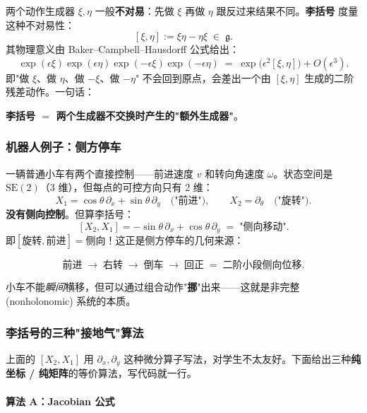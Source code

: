 \documentclass[11pt,a4paper]{article}
\theoremstyle{mythm}
\theoremstyle{mydef}
\begin{document}
两个动作生成器 $\xi, \eta$ 一般\textbf{不对易}：先做 $\xi$ 再做 $\eta$ 跟反过来结果不同。\textbf{李括号} 度量这种不对易性：
$$[\xi, \eta] := \xi\eta - \eta\xi \;\in\; \mathfrak{g}.$$
其物理意义由 Baker--Campbell--Hausdorff 公式给出：
\begin{equation}\label{eq:bch}
\exp(\epsilon\xi)\exp(\epsilon\eta)\exp(-\epsilon\xi)\exp(-\epsilon\eta) \;=\; \exp\!\big(\epsilon^2 [\xi,\eta]\big) + O(\epsilon^3).
\end{equation}
即"做 $\xi$、做 $\eta$、做 $-\xi$、做 $-\eta$" 不会回到原点，会差出一个由 $[\xi,\eta]$ 生成的二阶残差动作。一句话：

\begin{tcolorbox}[colback=yellow!8,colframe=orange!50!black]
\textbf{李括号 $=$ 两个生成器不交换时产生的"额外生成器"}。
\end{tcolorbox}

\subsubsection*{机器人例子：侧方停车}

一辆普通小车有两个直接控制——前进速度 $v$ 和转向角速度 $\omega$。状态空间是 $\mathrm{SE}(2)$（3 维），但每点的可控方向只有 2 维：
$$X_1 = \cos\theta\,\partial_x + \sin\theta\,\partial_y\quad\text{("前进")},\qquad X_2 = \partial_\theta\quad\text{("旋转")}.$$
\textbf{没有侧向控制}。但算李括号：
$$[X_2, X_1] = -\sin\theta\,\partial_x + \cos\theta\,\partial_y \;=\; \text{"侧向移动"}.$$
即\textbf{$[\text{旋转}, \text{前进}] = \text{侧向}$}！这正是侧方停车的几何来源：

$$\text{前进}\; \to\; \text{右转}\; \to\; \text{倒车}\; \to\; \text{回正}\; =\; \text{二阶小段侧向位移}.$$

小车不能\emph{瞬间}横移，但可以通过组合动作"\textbf{挪}"出来——这就是非完整 (nonholonomic) 系统的本质。

\subsubsection*{李括号的三种"接地气"算法}

上面的 $[X_2, X_1]$ 用 $\partial_x, \partial_y$ 这种微分算子写法，对学生不太友好。下面给出三种\textbf{纯坐标 / 纯矩阵}的等价算法，写代码就一行。

\paragraph{算法 A：Jacobian 公式}
\end{document}
